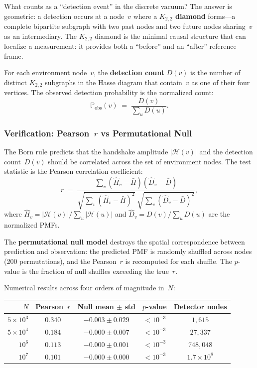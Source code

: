 \documentclass[11pt, a4paper, openany]{book}
\begin{document}
What counts as a ``detection event'' in the discrete vacuum?
The answer is geometric: a detection occurs at a node~$v$
where a \textbf{$K_{2,2}$ diamond} forms---a complete bipartite
subgraph with two past nodes and two future nodes sharing~$v$
as an intermediary. The $K_{2,2}$ diamond is the minimal
causal structure that can localize a measurement: it provides
both a ``before'' and an ``after'' reference frame.

\begin{definition}
\label{def:k22-detection}
For each environment node~$v$, the \textbf{detection count}
$D(v)$ is the number of distinct $K_{2,2}$ subgraphs in the
Hasse diagram that contain~$v$ as one of their four vertices.
The observed detection probability is the normalized count:
\[
  \mathbb{P}_{\mathrm{obs}}(v) \;=\;
  \frac{D(v)}{\sum_{u} D(u)}.
\]
\end{definition}

\subsubsection{Verification: Pearson~$r$ vs Permutational Null}

The Born rule predicts that the handshake amplitude
$|\mathcal{H}(v)|$ and the detection count~$D(v)$ should be
correlated across the set of environment nodes. The test
statistic is the Pearson correlation coefficient:
\[
  r \;=\;
  \frac{\sum_v (\hat{H}_v - \bar{H})(\hat{D}_v - \bar{D})}
       {\sqrt{\sum_v (\hat{H}_v - \bar{H})^2}
        \;\sqrt{\sum_v (\hat{D}_v - \bar{D})^2}},
\]
where $\hat{H}_v = |\mathcal{H}(v)| / \sum_u |\mathcal{H}(u)|$
and $\hat{D}_v = D(v) / \sum_u D(u)$ are the normalized PMFs.

The \textbf{permutational null model} destroys the spatial
correspondence between prediction and observation: the
predicted PMF is randomly shuffled across nodes (200
permutations), and the Pearson~$r$ is recomputed for each
shuffle. The $p$-value is the fraction of null shuffles
exceeding the true~$r$.

\medskip
\noindent Numerical results across four orders of magnitude
in~$N$:

\medskip
\begin{center}
\renewcommand{\arraystretch}{1.2}
\begin{tabular}{rcccc}
\toprule
$N$ & Pearson~$r$ & Null mean $\pm$ std &
  $p$-value & Detector nodes \\
\midrule
$5 \times 10^3$   & $0.340$ & $-0.003 \pm 0.029$ &
  $< 10^{-3}$ & $1{,}615$ \\
$5 \times 10^4$   & $0.184$ & $-0.000 \pm 0.007$ &
  $< 10^{-3}$ & $27{,}337$ \\
$10^6$            & $0.113$ & $-0.000 \pm 0.001$ &
  $< 10^{-3}$ & $748{,}048$ \\
$10^7$            & $0.101$ & $-0.000 \pm 0.000$ &
  $< 10^{-3}$ & $1.7 \times 10^8$ \\
\bottomrule
\end{tabular}
\end{center}
\end{document}
